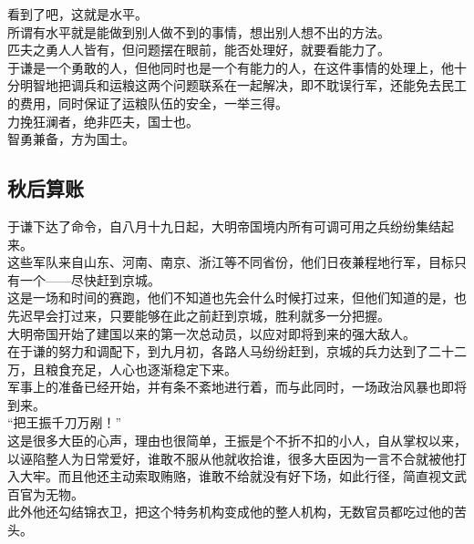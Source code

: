 \begin{multicols}{\theparacolNo}
看到了吧，这就是水平。\\

所谓有水平就是能做到别人做不到的事情，想出别人想不出的方法。\\

匹夫之勇人人皆有，但问题摆在眼前，能否处理好，就要看能力了。\\

于谦是一个勇敢的人，但他同时也是一个有能力的人，在这件事情的处理上，他十分明智地把调兵和运粮这两个问题联系在一起解决，即不耽误行军，还能免去民工的费用，同时保证了运粮队伍的安全，一举三得。\\

力挽狂澜者，绝非匹夫，国士也。\\

智勇兼备，方为国士。\\

\subsection{秋后算账}
于谦下达了命令，自八月十九日起，大明帝国境内所有可调可用之兵纷纷集结起来。\\

这些军队来自山东、河南、南京、浙江等不同省份，他们日夜兼程地行军，目标只有一个——尽快赶到京城。\\

这是一场和时间的赛跑，他们不知道也先会什么时候打过来，但他们知道的是，也先迟早会打过来，只要能够在此之前赶到京城，胜利就多一分把握。\\

大明帝国开始了建国以来的第一次总动员，以应对即将到来的强大敌人。\\

在于谦的努力和调配下，到九月初，各路人马纷纷赶到，京城的兵力达到了二十二万，且粮食充足，人心也逐渐稳定下来。\\

军事上的准备已经开始，并有条不紊地进行着，而与此同时，一场政治风暴也即将到来。\\

“把王振千刀万剐！”\\

这是很多大臣的心声，理由也很简单，王振是个不折不扣的小人，自从掌权以来，以诬陷整人为日常爱好，谁敢不服从他就收拾谁，很多大臣因为一言不合就被他打入大牢。而且他还主动索取贿赂，谁敢不给就没有好下场，如此行径，简直视文武百官为无物。\\

此外他还勾结锦衣卫，把这个特务机构变成他的整人机构，无数官员都吃过他的苦头。\\


\end{multicols}
